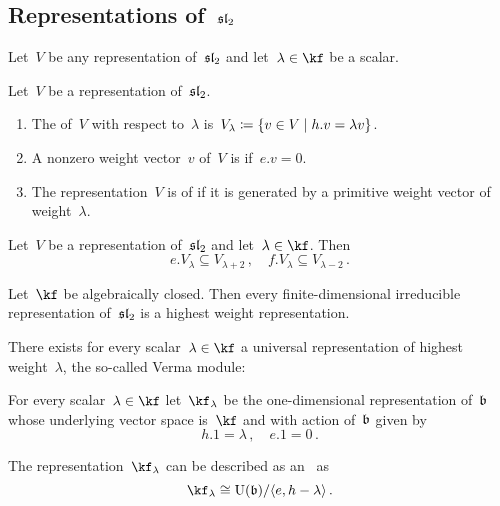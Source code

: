 \documentclass[a4paper, 11pt, oneside]{scrartcl}
\begin{document}
\subsection{Representations of~$\mathfrak{sl}_2$}

Let~$V$ be any representation of~$\mathfrak{sl}_2$ and let~$\lambda \in \kf$ be a scalar.

\begin{definition}
  Let~$V$ be a representation of~$\mathfrak{sl}_2$.
  \begin{enumerate}
    \item
      The  of~$V$ with respect to~$\lambda$ is~$V_\lambda \defined \{ v \in V \suchthat h.v = \lambda v \}$.
    \item
      A nonzero weight vector~$v$ of~$V$ is  if~$e.v = 0$.
    \item
      The representation~$V$ is of  if it is generated by a primitive weight vector of weight~$\lambda$.
  \end{enumerate}
\end{definition}

\begin{proposition}
  Let~$V$ be a representation of~$\mathfrak{sl}_2$ and let~$\lambda \in \kf$.
  Then
  \[
    e.V_\lambda
    \subseteq
    V_{\lambda + 2} \,,
    \quad
    f.V_\lambda
    \subseteq
    V_{\lambda - 2} \,.
  \]
\end{proposition}

\begin{lemma}
  Let~$\kf$ be algebraically closed.
  Then every finite-dimensional irreducible representation of~$\mathfrak{sl}_2$ is a highest weight representation.
\end{lemma}

There exists for every scalar~$\lambda \in \kf$ a universal representation of highest weight~$\lambda$, the so-called Verma module: 

\begin{definition}
  For every scalar~$\lambda \in \kf$ let~$\kf_\lambda$ be the one-dimensional representation of~$\mathfrak{b}$ whose underlying vector space is~$\kf$ and with action of~$\mathfrak{b}$ given by
  \[
    h.1 = \lambda \,,
    \quad
    e.1 = 0 \,.
  \]
\end{definition}

\begin{lemma}
  The representation~$\kf_\lambda$ can be described as an~\module{$\Univ(\blie)$} as
  \[
    \kf_\lambda
    \cong
    \Univ(\blie)
    /
    \gen{e, h - \lambda} \,.
  \]
\end{lemma}
\end{document}
